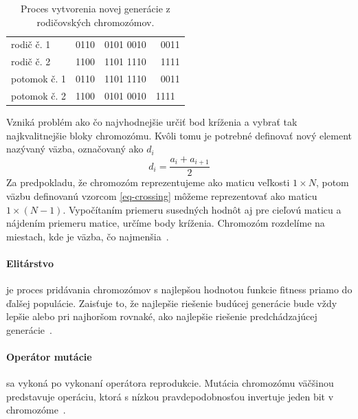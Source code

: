 \documentclass[a4paper,slovak,12pt,appendix]{article}
\begin{document}
\begin{table}[H]
  \centering
  \caption{Proces vytvorenia novej generácie z rodičovských chromozómov.}
  \label{tab-crossing}
  \begin{tabular}{p{4cm}l|l|l}
    rodič č. 1      &  0110 & 0101  0010 & 0011  \\
    rodič č. 2      &  1100 & 1101  1110 & 1111  \\
    \hline
    potomok č. 1    &  0110 & 1101  1110 & 0011  \\
    potomok č. 2    &  1100 & 0101  0010 & 1111  \\
  \end{tabular}
\end{table}

Vzniká problém ako čo najvhodnejšie určiť bod kríženia a vybrať tak
najkvalitnejšie bloky chromozómu. Kvôli tomu je potrebné definovať nový element
nazývaný väzba, označovaný ako $d_i$
\begin{equation}
  d_i = \frac{a_i + a_{i+1}}{2}
  \label{eq-crossing}
\end{equation}
Za predpokladu, že chromozóm reprezentujeme ako maticu veľkosti $1 \times N$,
potom väzbu definovanú vzorcom \ref{eq-crossing} môžeme reprezentovať ako
maticu $1 \times (N-1)$. Vypočítaním priemeru susedných hodnôt aj pre cieľovú
maticu a nájdením priemeru matice, určíme body kríženia. Chromozóm rozdelíme na
miestach, kde je väzba, čo najmenšia~\cite{Simonova2007}.

\paragraph{Elitárstvo} je proces pridávania chromozómov s najlepšou hodnotou
funkcie fitness priamo do ďalšej populácie. Zaisťuje to, že najlepšie riešenie
budúcej generácie bude vždy lepšie alebo pri najhoršom rovnaké, ako najlepšie
riešenie predchádzajúcej generácie~\cite{Deolekar2016}.

\paragraph{Operátor mutácie} sa vykoná po vykonaní operátora reprodukcie.
Mutácia chromozómu väčšinou predstavuje operáciu, ktorá s nízkou
pravdepodobnosťou invertuje jeden bit v chromozóme~\cite{Chavan2015}.
\end{document}
